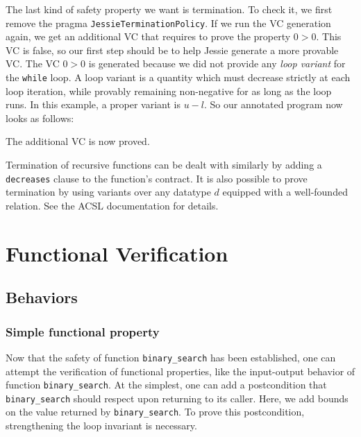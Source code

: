 \documentclass[a4paper,11pt,twoside,openright]{report}
\begin{document}
The last kind of safety property we want is termination. To check it,
we first remove the pragma \texttt{JessieTerminationPolicy}. If we run
the VC generation again, we get an additional VC that requires to prove
the property $0 > 0$. This VC is false, so our first step should be
to help Jessie generate a more provable VC.
The VC $0 > 0$ is generated because we did not provide any
\emph{loop variant} for the \texttt{while} loop. A loop variant is a
quantity which must decrease strictly at each loop iteration, while
provably remaining non-negative for as long as the loop runs. 
In this example, a proper variant is $u-l$. 
So our annotated program now looks as follows:



The additional VC is now proved.

Termination of recursive functions can be dealt with similarly by
adding a \texttt{decreases} clause to the function's contract. 
It is also possible to prove termination by using variants over 
any datatype $d$ equipped with a well-founded relation. 
See the ACSL documentation for details.




\chapter{Functional Verification}


\section{Behaviors}

\subsection{Simple functional property}

Now that the safety of function \verb|binary_search| has been established, one
can attempt the verification of functional properties, like the
input-output behavior of function \verb|binary_search|. At the
simplest, one can add a postcondition that \verb|binary_search| should
respect upon returning to its caller. Here, we add bounds on the value
returned by \verb|binary_search|. To prove this postcondition,
strengthening the loop invariant is necessary.
\end{document}
